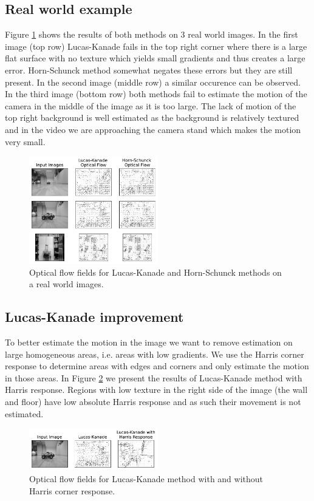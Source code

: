 \documentclass[9pt]{IEEEtran}
\begin{document}
\subsection*{Real world example}

Figure \ref{lk-hs-real} shows the results of both methods on 3 real world images.
In the first image (top row) Lucas-Kanade fails in the top right corner where there is a large flat surface with no texture which yields small gradients and thus creates a large error.
Horn-Schunck method somewhat negates these errors but they are still present.
In the second image (middle row) a similar occurence can be observed.
In the third image (bottom row) both methods fail to estimate the motion of the camera in the middle of the image as it is too large.
The lack of motion of the top right background is well estimated as the background is relatively textured and in the video we are approaching the camera stand which makes the motion very small.
\begin{figure}[H]
    \centering
    \includegraphics[width=0.5\textwidth]{LK_HS_real.pdf}
    \vspace{-15px}
    \caption{Optical flow fields for Lucas-Kanade and Horn-Schunck methods on a real world images.}
    \label{lk-hs-real}
\end{figure}

\subsection*{Lucas-Kanade improvement}
To better estimate the motion in the image we want to remove estimation on large homogeneous areas, i.e. areas with low gradients.
We use the Harris corner response to determine areas with edges and corners and only estimate the motion in those areas.
In Figure \ref{lk-improvement} we present the results of Lucas-Kanade method with Harris response.
Regions with low texture in the right side of the image (the wall and floor) have low absolute Harris response and as such their movement is not estimated.
\begin{figure}[H]
    \centering
    \includegraphics[width=0.5\textwidth]{LK_Harris.pdf}
    \vspace{-15px}
    \caption{Optical flow fields for Lucas-Kanade method with and without Harris corner response.}
    \label{lk-improvement}
\end{figure}
\end{document}
